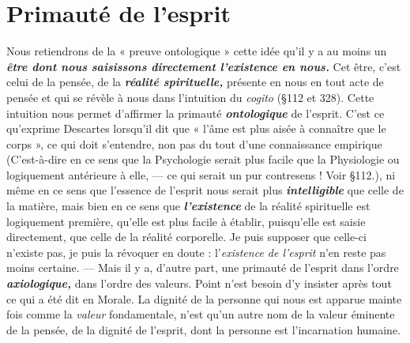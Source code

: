 \section{Primauté de l’esprit}%
Nous retiendrons de la « preuve
ontologique » cette idée qu’il y a au moins un \textbf{\textit {être dont nous saisissons
directement l'existence en nous.}} Cet être, c’est celui de la
pensée, de la \textbf{\textit {réalité spirituelle,}} présente en nous en tout acte de
pensée et qui se révèle à nous dans l'intuition du {\it cogito} (\S 112 et
328). Cette intuition nous permet d’affirmer la primauté \textbf{\textit {ontologique}}
de l'esprit. C’est ce qu’exprime Descartes lorsqu'il dit que
« l’âme est plus aisée à connaître que le corps », ce qui doit s’entendre,
non pas du tout d’une connaissance empirique
{\footnotesize (C'est-à-dire en ce sens que la Psychologie serait plus facile que la Physiologie ou
logiquement antérieure à elle, — ce qui serait un pur contresens ! Voir \S 112.)},
ni même en ce sens
que l’essence de l’esprit nous serait plus \textbf{\textit {intelligible}} que celle de la
matière, mais bien en ce sens que \textbf{\textit {l'existence}} de la réalité spirituelle
est logiquement première, qu’elle est plus facile à établir, puisqu’elle
est saisie directement, que celle de la réalité corporelle. Je puis supposer
que celle-ci n’existe pas, je puis la révoquer en doute : l’{\it existence
de l'esprit} n’en reste pas moins certaine. — Mais il y a, d’autre part,
une primauté de l'esprit dans l’ordre \textbf{\textit {axiologique,}} dans l’ordre des
valeurs. Point n’est besoin d’y insister après tout ce qui a été dit en
Morale. La dignité de la personne qui nous est apparue mainte fois
comme la {\it valeur} fondamentale, n’est qu’un autre nom de la valeur
éminente de la pensée, de la dignité de l’esprit, dont la personne est
l’incarnation humaine.


